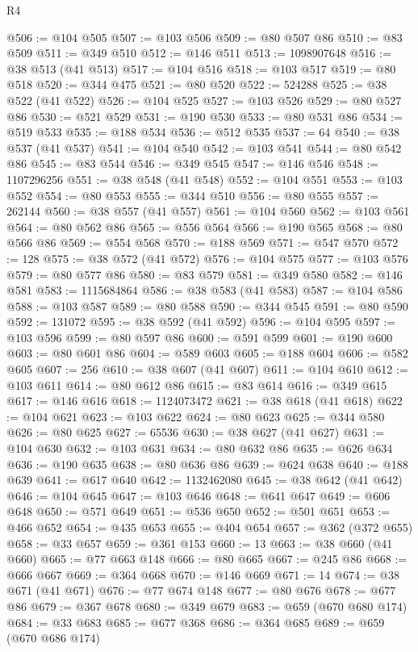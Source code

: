 \begin{lexlean}{R4}
\begin{coremodule}
@506 := @104 @505
@507 := @103 @506
@509 := @80 @507 @86
@510 := @83 @509
@511 := @349 @510
@512 := @146 @511
@513 := 1098907648
@516 := @38 @513 (@41 @513)
@517 := @104 @516
@518 := @103 @517
@519 := @80 @518
@520 := @344 @475
@521 := @80 @520
@522 := 524288
@525 := @38 @522 (@41 @522)
@526 := @104 @525
@527 := @103 @526
@529 := @80 @527 @86
@530 := @521 @529
@531 := @190 @530
@533 := @80 @531 @86
@534 := @519 @533
@535 := @188 @534
@536 := @512 @535
@537 := 64
@540 := @38 @537 (@41 @537)
@541 := @104 @540
@542 := @103 @541
@544 := @80 @542 @86
@545 := @83 @544
@546 := @349 @545
@547 := @146 @546
@548 := 1107296256
@551 := @38 @548 (@41 @548)
@552 := @104 @551
@553 := @103 @552
@554 := @80 @553
@555 := @344 @510
@556 := @80 @555
@557 := 262144
@560 := @38 @557 (@41 @557)
@561 := @104 @560
@562 := @103 @561
@564 := @80 @562 @86
@565 := @556 @564
@566 := @190 @565
@568 := @80 @566 @86
@569 := @554 @568
@570 := @188 @569
@571 := @547 @570
@572 := 128
@575 := @38 @572 (@41 @572)
@576 := @104 @575
@577 := @103 @576
@579 := @80 @577 @86
@580 := @83 @579
@581 := @349 @580
@582 := @146 @581
@583 := 1115684864
@586 := @38 @583 (@41 @583)
@587 := @104 @586
@588 := @103 @587
@589 := @80 @588
@590 := @344 @545
@591 := @80 @590
@592 := 131072
@595 := @38 @592 (@41 @592)
@596 := @104 @595
@597 := @103 @596
@599 := @80 @597 @86
@600 := @591 @599
@601 := @190 @600
@603 := @80 @601 @86
@604 := @589 @603
@605 := @188 @604
@606 := @582 @605
@607 := 256
@610 := @38 @607 (@41 @607)
@611 := @104 @610
@612 := @103 @611
@614 := @80 @612 @86
@615 := @83 @614
@616 := @349 @615
@617 := @146 @616
@618 := 1124073472
@621 := @38 @618 (@41 @618)
@622 := @104 @621
@623 := @103 @622
@624 := @80 @623
@625 := @344 @580
@626 := @80 @625
@627 := 65536
@630 := @38 @627 (@41 @627)
@631 := @104 @630
@632 := @103 @631
@634 := @80 @632 @86
@635 := @626 @634
@636 := @190 @635
@638 := @80 @636 @86
@639 := @624 @638
@640 := @188 @639
@641 := @617 @640
@642 := 1132462080
@645 := @38 @642 (@41 @642)
@646 := @104 @645
@647 := @103 @646
@648 := @641 @647
@649 := @606 @648
@650 := @571 @649
@651 := @536 @650
@652 := @501 @651
@653 := @466 @652
@654 := @435 @653
@655 := @404 @654
@657 := @362 (@372 @655)
@658 := @33 @657
@659 := @361 @153
@660 := 13
@663 := @38 @660 (@41 @660)
@665 := @77 @663 @148
@666 := @80 @665
@667 := @245 @86
@668 := @666 @667
@669 := @364 @668
@670 := @146 @669
@671 := 14
@674 := @38 @671 (@41 @671)
@676 := @77 @674 @148
@677 := @80 @676
@678 := @677 @86
@679 := @367 @678
@680 := @349 @679
@683 := @659 (@670 @680 @174)
@684 := @33 @683
@685 := @677 @368
@686 := @364 @685
@689 := @659 (@670 @686 @174)

\end{coremodule}
\end{lexlean}
